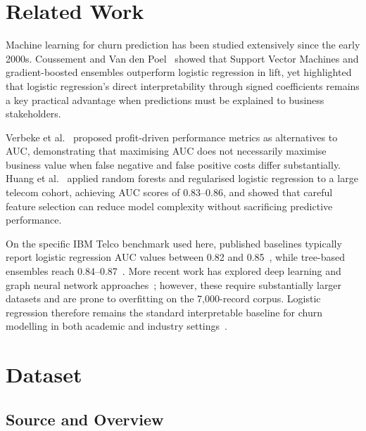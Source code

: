 \documentclass{llncs}
\begin{document}
\section{Related Work}
\label{sec:related}

Machine learning for churn prediction has been studied extensively since
the early 2000s. Coussement and Van den Poel~\cite{coussement2008churn}
showed that Support Vector Machines and gradient-boosted ensembles
outperform logistic regression in lift, yet highlighted that logistic
regression's direct interpretability through signed coefficients remains
a key practical advantage when predictions must be explained to business
stakeholders.

Verbeke et al.~\cite{verbeke2012new} proposed profit-driven performance
metrics as alternatives to AUC, demonstrating that maximising AUC does
not necessarily maximise business value when false negative and false
positive costs differ substantially. Huang et al.~\cite{huang2015customer}
applied random forests and regularised logistic regression to a large
telecom cohort, achieving AUC scores of 0.83--0.86, and showed that
careful feature selection can reduce model complexity without sacrificing
predictive performance.

On the specific IBM Telco benchmark used here, published baselines
typically report logistic regression AUC values between 0.82 and
0.85~\cite{huang2015customer}, while tree-based ensembles reach
0.84--0.87~\cite{bhatt2020telco}.
More recent work has explored deep learning and graph neural network
approaches~\cite{vo2021deep}; however, these require substantially
larger datasets and are prone to overfitting on the 7{,}000-record corpus.
Logistic regression therefore remains the standard interpretable baseline
for churn modelling in both academic and industry
settings~\cite{lariviere2005predicting}.

\section{Dataset}
\label{sec:dataset}

\subsection{Source and Overview}
\end{document}
